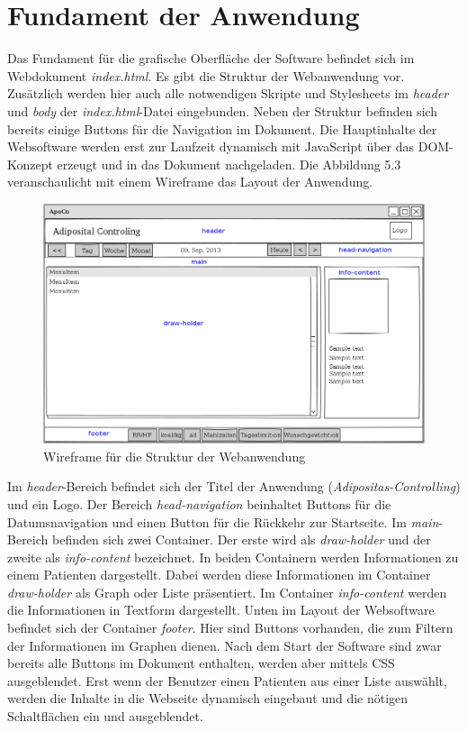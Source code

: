 

\section{Fundament der Anwendung}

Das Fundament f\"ur die grafische Oberfl\"ache der Software befindet sich im Webdokument \emph{index.html}.
Es gibt die Struktur der Webanwendung vor.
Zus\"atzlich werden hier auch alle notwendigen Skripte und Stylesheets
im \emph{header} und \emph{body} der \emph{index.html}-Datei eingebunden.
Neben der Struktur befinden sich bereits einige Buttons f\"ur die Navigation im Dokument.
Die Hauptinhalte der Websoftware werden erst zur Laufzeit dynamisch mit JavaScript \"uber das 
DOM-Konzept erzeugt und in das Dokument nachgeladen.
Die Abbildung 5.3 veranschaulicht mit einem Wireframe das Layout der Anwendung.

\begin{figure}[h]
\centering
  \includegraphics[scale=0.4]{screenshots/kapitel5/wireframe.png}
  \caption{Wireframe f\"ur die Struktur der Webanwendung}
\end{figure}

Im \emph{header}-Bereich befindet sich der Titel der Anwendung (\emph{Adipositas-Controlling}) und ein Logo.
Der Bereich \emph{head-navigation} beinhaltet Buttons f\"ur die Datumsnavigation und einen Button f\"ur die 
R\"uckkehr zur Startseite.
Im \emph{main}-Bereich befinden sich zwei Container.
Der erste wird als \emph{draw-holder} und der zweite als \emph{info-content} bezeichnet.
In beiden Containern werden Informationen zu einem Patienten dargestellt.
Dabei werden diese Informationen im Container \emph{draw-holder} als Graph oder Liste pr\"asentiert.
Im Container \emph{info-content} werden die Informationen in Textform dargestellt.
Unten im Layout der Websoftware befindet sich der Container \emph{footer}.
Hier sind Buttons vorhanden, die zum Filtern der Informationen im Graphen dienen.
Nach dem Start der Software sind zwar bereits alle Buttons im Dokument enthalten, 
werden aber mittels CSS ausgeblendet.
Erst wenn der Benutzer einen Patienten aus einer Liste ausw\"ahlt, 
werden die Inhalte in die Webseite dynamisch eingebaut und 
die n\"otigen Schaltfl\"achen ein und ausgeblendet.

